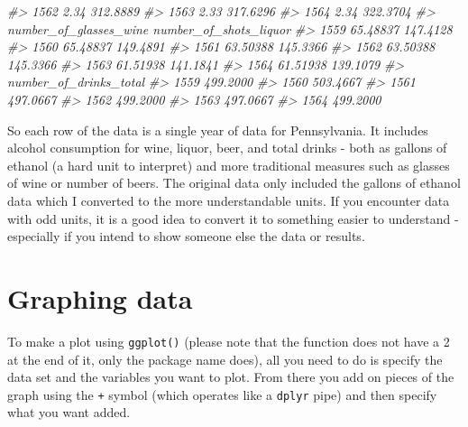 \documentclass[
]{krantz}
\makeatletter
\newenvironment{Shaded}{\begin{snugshade}}{\end{snugshade}}
\newcommand{\CommentTok}[1]{\textcolor[rgb]{0.37,0.37,0.37}{\textit{#1}}}
\newenvironment{kframe}{%
\medskip{}
\setlength{\fboxsep}{.8em}
 \def\at@end@of@kframe{}%
 \ifinner\ifhmode%
  \def\at@end@of@kframe{\end{minipage}}%
  \begin{minipage}{\columnwidth}%
 \fi\fi%
 \def\FrameCommand##1{\hskip\@totalleftmargin \hskip-\fboxsep
 \colorbox{shadecolor}{##1}\hskip-\fboxsep
     \hskip-\linewidth \hskip-\@totalleftmargin \hskip\columnwidth}%
 \MakeFramed {\advance\hsize-\width
   \@totalleftmargin\z@ \linewidth\hsize
   \@setminipage}}%
 {\par\unskip\endMakeFramed%
 \at@end@of@kframe}
\renewenvironment{Shaded}{\begin{kframe}}{\end{kframe}}
\makeatother
\begin{document}
\begin{Shaded}
\begin{Highlighting}[]
\CommentTok{\#\textgreater{} 1562                                  2.34        312.8889}
\CommentTok{\#\textgreater{} 1563                                  2.33        317.6296}
\CommentTok{\#\textgreater{} 1564                                  2.34        322.3704}
\CommentTok{\#\textgreater{}      number\_of\_glasses\_wine number\_of\_shots\_liquor}
\CommentTok{\#\textgreater{} 1559               65.48837               147.4128}
\CommentTok{\#\textgreater{} 1560               65.48837               149.4891}
\CommentTok{\#\textgreater{} 1561               63.50388               145.3366}
\CommentTok{\#\textgreater{} 1562               63.50388               145.3366}
\CommentTok{\#\textgreater{} 1563               61.51938               141.1841}
\CommentTok{\#\textgreater{} 1564               61.51938               139.1079}
\CommentTok{\#\textgreater{}      number\_of\_drinks\_total}
\CommentTok{\#\textgreater{} 1559               499.2000}
\CommentTok{\#\textgreater{} 1560               503.4667}
\CommentTok{\#\textgreater{} 1561               497.0667}
\CommentTok{\#\textgreater{} 1562               499.2000}
\CommentTok{\#\textgreater{} 1563               497.0667}
\CommentTok{\#\textgreater{} 1564               499.2000}
\end{Highlighting}
\end{Shaded}

So each row of the data is a single year of data for
Pennsylvania. It includes alcohol consumption for wine,
liquor, beer, and total drinks - both as gallons of ethanol
(a hard unit to interpret) and more traditional measures
such as glasses of wine or number of beers. The original
data only included the gallons of ethanol data which I
converted to the more understandable units. If you encounter
data with odd units, it is a good idea to convert it to
something easier to understand - especially if you intend to
show someone else the data or results.

\hypertarget{graphing-data}{%
\section{Graphing data}\label{graphing-data}}

To make a plot using \texttt{ggplot()} (please note that the
function does not have a 2 at the end of it, only the
package name does), all you need to do is specify the data
set and the variables you want to plot. From there you add
on pieces of the graph using the \texttt{+} symbol (which
operates like a \texttt{dplyr} pipe) and then specify what
you want added.
\end{document}
